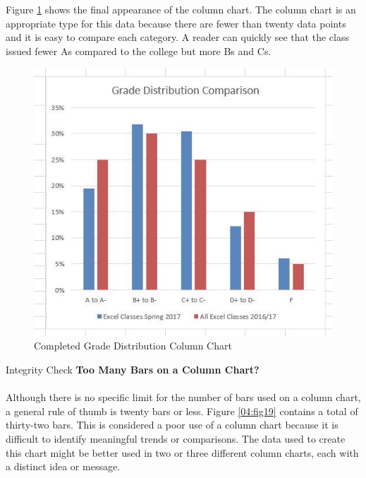 Figure \ref{04:fig18} shows the final appearance of the column chart. The column chart is an appropriate type for this data because there are fewer than twenty data points and it is easy to compare each category. A reader can quickly see that the class issued fewer As compared to the college but more Bs and Cs.

\begin{figure}[H]
	\centering
	\includegraphics[width=\maxwidth{.95\linewidth}]{gfx/ch04_fig18}
	\caption{Completed Grade Distribution Column Chart}
	\label{04:fig18}
\end{figure}

\begin{center}
	\begin{infobox}{Integrity Check}
		\textbf{Too Many Bars on a Column Chart?}
		\\
		\\
		 Although there is no specific limit for the number of bars used on a column chart, a general rule of thumb is twenty bars or less. Figure \ref{04:fig19} contains a total of thirty-two bars. This is considered a poor use of a column chart because it is difficult to identify meaningful trends or comparisons. The data used to create this chart might be better used in two or three different column charts, each with a distinct idea or message.
	\end{infobox}
\end{center}


